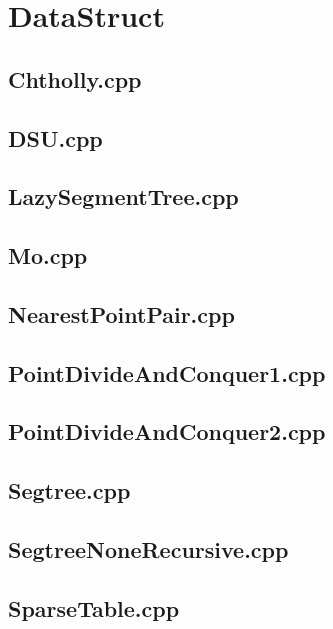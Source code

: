 \section{DataStruct}
\subsection{Chtholly.cpp}

\subsection{DSU.cpp}

\subsection{LazySegmentTree.cpp}

\subsection{Mo.cpp}

\subsection{NearestPointPair.cpp}

\subsection{PointDivideAndConquer1.cpp}

\subsection{PointDivideAndConquer2.cpp}

\subsection{Segtree.cpp}

\subsection{SegtreeNoneRecursive.cpp}

\subsection{SparseTable.cpp}

